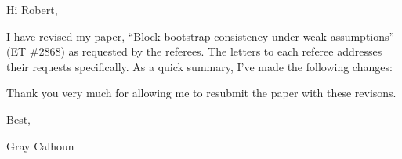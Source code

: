 \documentclass[12pt]{article}
\begin{document}
\noindent Hi Robert,

\strut

I have revised my paper, ``Block bootstrap consistency under weak
assumptions'' (ET \#2868) as requested by the referees. The letters to
each referee addresses their requests specifically. As a quick
summary, I've made the following changes:



Thank you very much for allowing me to resubmit the paper with these
revisons.

\strut

\noindent Best,

\noindent Gray Calhoun
\end{document}
